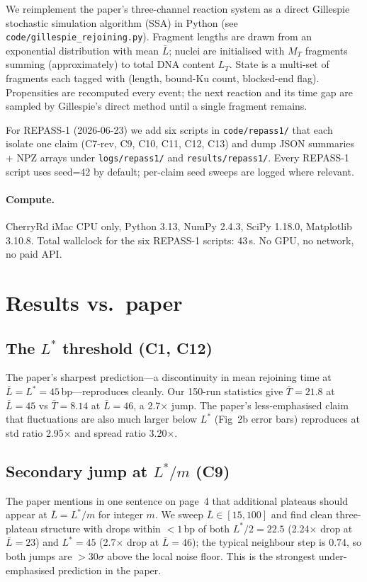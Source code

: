 \documentclass[11pt]{article}
\begin{document}
We reimplement the paper's three-channel reaction system as a direct Gillespie stochastic
simulation algorithm (SSA) in Python (see \texttt{code/gillespie\_rejoining.py}). Fragment
lengths are drawn from an exponential distribution with mean $\bar L$; nuclei are
initialised with $M_T$ fragments summing (approximately) to total DNA content $L_T$.
State is a multi-set of fragments each tagged with (length, bound-Ku count, blocked-end
flag). Propensities are recomputed every event; the next reaction and its time gap are
sampled by Gillespie's direct method until a single fragment remains.

For REPASS-1 (2026-06-23) we add six scripts in \texttt{code/repass1/} that each isolate
one claim (C7-rev, C9, C10, C11, C12, C13) and dump JSON summaries + NPZ arrays under
\texttt{logs/repass1/} and \texttt{results/repass1/}. Every REPASS-1 script uses
seed=42 by default; per-claim seed sweeps are logged where relevant.

\paragraph{Compute.} CherryRd iMac CPU only, Python 3.13, NumPy 2.4.3, SciPy 1.18.0,
Matplotlib 3.10.8. Total wallclock for the six REPASS-1 scripts: 43\,s. No GPU, no
network, no paid API.

\section{Results vs.\ paper}

\subsection{The $L^\ast$ threshold (C1, C12)}
The paper's sharpest prediction---a discontinuity in mean rejoining time at
$\bar L = L^\ast = 45$\,bp---reproduces cleanly. Our 150-run statistics give
$\bar T = 21.8$ at $\bar L = 45$ vs $\bar T = 8.14$ at $\bar L = 46$, a 2.7$\times$ jump.
The paper's less-emphasised claim that fluctuations are also much larger below
$L^\ast$ (Fig~2b error bars) reproduces at std ratio 2.95$\times$ and spread ratio 3.20$\times$.

\subsection{Secondary jump at $L^\ast/m$ (C9)}
The paper mentions in one sentence on page~4 that additional plateaus should appear at
$\bar L = L^\ast/m$ for integer $m$. We sweep $\bar L \in [15,100]$ and find clean
three-plateau structure with drops within $<1$\,bp of both $L^\ast/2 = 22.5$ (2.24$\times$
drop at $\bar L=23$) and $L^\ast = 45$ (2.7$\times$ drop at $\bar L=46$); the typical
neighbour step is 0.74, so both jumps are $>30\sigma$ above the local noise floor. This
is the strongest under-emphasised prediction in the paper.
\end{document}

